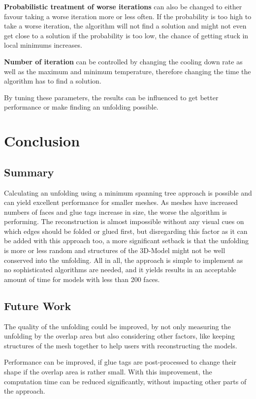 \documentclass[draft,final]{vutinfth} %
\begin{document}
\textbf{Probabilistic treatment of worse iterations} can also be changed to either favour taking a worse iteration more or less often. If the probability is too high to take a worse iteration, the algorithm will not find a solution and might not even get close to a solution if the probability is too low, the chance of getting stuck in local minimums increases.

\textbf{Number of iteration} can be controlled by changing the cooling down rate as well as the maximum and minimum temperature, therefore changing the time the algorithm has to find a solution.

By tuning these parameters, the results can be influenced to get better performance or make finding an unfolding possible.

\chapter{Conclusion}
\label{chap:conclusion}

\section{Summary}
Calculating an unfolding using a minimum spanning tree approach is possible and can yield excellent performance for smaller meshes. As meshes have increased numbers of faces and glue tags increase in size, the worse the algorithm is performing. The reconstruction is almost impossible without any visual cues on which edges should be folded or glued first, but disregarding this factor as it can be added with this approach too, a more significant setback is that the unfolding is more or less random and structures of the 3D-Model might not be well conserved into the unfolding. All in all, the approach is simple to implement as no sophisticated algorithms are needed, and it yields results in an acceptable amount of time for models with less than 200 faces.

\section{Future Work}
The quality of the unfolding could be improved, by not only measuring the unfolding by the overlap area but also considering other factors, like keeping structures of the mesh together to help users with reconstructing the models.

Performance can be improved, if glue tags are post-processed to change their shape if the overlap area is rather small. With this improvement, the computation time can be reduced significantly, without impacting other parts of the approach.
\end{document}
